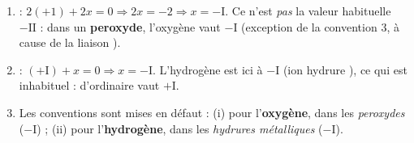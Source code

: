\documentclass[11pt,a4paper]{article}
\begin{document}
\begin{corrige}
\begin{enumerate}[label=\alph*),leftmargin=1.8em,topsep=2pt,itemsep=1.5pt]
  \item {} : $2(+1) + 2x = 0 \Rightarrow 2x = -2 \Rightarrow x = -\mathrm{I}$. Ce n'est \emph{pas} la
        valeur habituelle $-\mathrm{II}$ : dans un \textbf{peroxyde}, l'oxygène vaut $-\mathrm{I}$ (exception
        de la convention 3, à cause de la liaison ).
  \item {} : $(+\mathrm{I}) + x = 0 \Rightarrow x = -\mathrm{I}$. L'hydrogène est ici à $-\mathrm{I}$
        (ion hydrure ), ce qui est inhabituel : d'ordinaire  vaut $+\mathrm{I}$.
  \item Les conventions sont mises en défaut : (i) pour l'\textbf{oxygène}, dans les \emph{peroxydes}
        ($-\mathrm{I}$) ; (ii) pour l'\textbf{hydrogène}, dans les \emph{hydrures métalliques} ($-\mathrm{I}$).
\end{enumerate}
\end{corrige}
\end{document}
